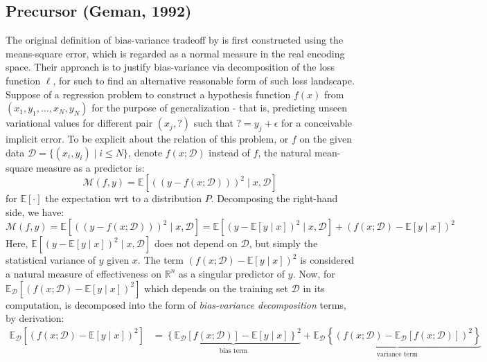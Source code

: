 \subsection{Precursor (Geman, 1992)}

The original definition of bias-variance tradeoff by \cite{6797087} is first constructed using the means-square error, which is regarded as a normal measure in the real encoding space. Their approach is to justify bias-variance via decomposition of the loss function $\ell$, for such to find an alternative reasonable form of such loss landscape. Suppose of a regression problem to construct a hypothesis function $f(x)$ from $(x_{1},y_{1},\dots,x_{N},y_{N})$ for the purpose of generalization - that is, predicting unseen variational values for different pair $(x_{j}, \mathord{?})$ such that $\mathord{?}=y_{j}+\epsilon$ for a conceivable implicit error. To be explicit about the relation of this problem, or $f$ on the given data $\mathcal{D}=\{(x_i, y_i)\mid i \leq N\}$, denote $f(x;\mathcal{D})$ instead of $f$, the natural mean-square measure as a predictor is: 
\begin{equation}
    \mathcal{M}(f,y) = \mathbb{E} \left[((y-f(x;\mathcal{D})))^{2}\mid x, \mathcal{D}\right] 
\end{equation} for $\mathbb{E}[\cdot]$ the expectation wrt to a distribution $P$. Decomposing the right-hand side, we have: 
\begin{equation}
    \mathcal{M}(f,y) = \mathbb{E} \left[((y-f(x;\mathcal{D})))^{2}\mid x, \mathcal{D}\right] = \mathbb{E}\left[(y-\mathbb{E}[y\mid x])^{2}\mid x,\mathcal{D}\right] + (f(x;\mathcal{D})-\mathbb{E}[y\mid x])^{2}
\end{equation}
Here, $\mathbb{E}\left[(y-\mathbb{E}[y\mid x])^{2}\mid x,\mathcal{D}\right]$ does not depend on $\mathcal{D}$, but simply the statistical variance of $y$ given $x$. The term $(f(x;\mathcal{D})-\mathbb{E}[y\mid x])^{2}$ is considered a natural measure of effectiveness on $\mathbb{R}^{n}$ as a singular predictor of $y$. Now, for $\mathbb{E}_{\mathcal{D}}\left[(f(x;\mathcal{D})-\mathbb{E}[y\mid x])^{2}\right]$ which depends on the training set $\mathcal{D}$ in its computation, is decomposed into the form of \textit{bias-variance decomposition} terms, by derivation: 
\begin{equation}
    \begin{split}
        \mathbb{E}_{\mathcal{D}} \left[(f(x;\mathcal{D})-\mathbb{E}[y\mid x])^{2}\right] & = \underbrace{\left\{ \mathbb{E}_{\mathcal{D}}[f(x;\mathcal{D})] - \mathbb{E}[y\mid x] \right\}^{2}}_{\text{bias term}} + \underbrace{\mathbb{E}_{\mathcal{D}} \left\{(f(x;\mathcal{D})- \mathbb{E}_{\mathcal{D}}[f(x;\mathcal{D})])^{2}\right\}}_{\text{variance term}}
    \end{split}
\end{equation}

